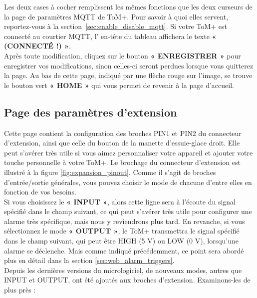 Les deux cases à cocher remplissent les mêmes fonctions que les deux curseurs de la page de paramètres MQTT
de ToM+. Pour savoir à quoi elles servent, reportez-vous à la section~\ref{sec:enable_disable_mqtt}.
Si votre ToM+ est connecté au courtier MQTT, l’ en-tête du tableau affichera le texte \textbf{« (CONNECTÉ !) »}.\\

Après toute modification, cliquez sur le bouton \textbf{« ENREGISTRER »} pour enregistrer vos modifications, sinon celles-ci seront perdues lorsque vous quitterez la page.
Au bas de cette page, indiqué par une flèche rouge sur l’image, se trouve le bouton vert \textbf{« HOME »} qui vous permet de revenir à la page d’accueil.


\subsection{Page des paramètres d’extension}
\label{sec:web_expansion_settings}

Cette page contient la configuration des broches PIN1 et PIN2 du connecteur d’extension, ainsi que celle du bouton de la manette d’essuie-glace droit.
Elle peut s’avérer très utile si vous aimez personnaliser votre appareil et ajouter votre touche personnelle à votre ToM+.
Le brochage du connecteur d’extension est illustré à la figure \ref{fig:expansion_pinout}. 
Comme il s’agit de broches d’entrée/sortie générales, vous pouvez choisir le mode de chacune d’entre elles en fonction de vos besoins.\\

Si vous choisissez le \textbf{« INPUT »}, alors cette ligne sera à l’écoute du signal spécifié
dans le champ suivant, ce qui peut s’avérer très utile pour configurer une alarme très spécifique, mais
nous y reviendrons plus tard. En revanche, si vous sélectionnez le mode \textbf{« OUTPUT »}, le ToM+
transmettra le signal spécifié dans le champ suivant, qui peut être HIGH (5 V) ou LOW
(0 V), lorsqu’une alarme se déclenche. Mais comme indiqué précédemment, ce point sera abordé plus en détail dans la section \ref{sec:web_alarm_triggers}.\\

Depuis les dernières versions du micrologiciel, de nouveaux modes, autres que INPUT et OUTPUT, ont été ajoutés aux broches d’extension. Examinons-les de plus près :\\

